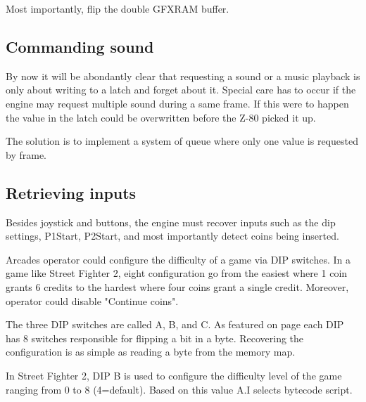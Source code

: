 Most importantly, flip the double GFXRAM buffer.

\subsection{Commanding sound}
By now it will be abondantly clear that requesting a sound or a music playback is only about writing to a latch and forget about it. Special care has to occur if the engine may request multiple sound during a same frame. If this were to happen the value in the latch could be overwritten before the Z-80 picked it up.

The solution is to implement a system of queue where only one value is requested by frame.

\pagebreak

 


\subsection{Retrieving inputs}
Besides joystick and buttons, the engine must recover inputs such as the dip settings, P1Start, P2Start, and most importantly detect coins being inserted.

\begin{trivia}
Arcades operator could configure the difficulty of a game via DIP switches. In a game like Street Fighter 2, eight configuration go from the easiest where 1 coin grants 6 credits to the hardest where four coins grant a single credit. Moreover, operator could disable "Continue coins"\cite{sf2manual}.
\end{trivia}

The three DIP switches are called A, B, and C. As featured on page \pageref{fig:boarda} each DIP has 8 switches responsible for flipping a bit in a byte. Recovering the configuration is as simple as reading a byte from the memory map.

\begin{trivia}
In Street Fighter 2, DIP B is used to configure the difficulty level of the game ranging from 0 to 8 (4=default). Based on this value A.I selects bytecode\cite{sf2aiengine} script.
\end{trivia}



